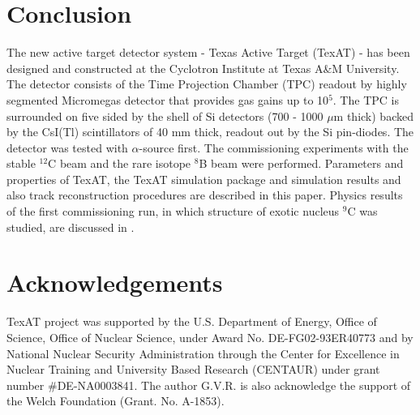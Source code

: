 \documentclass[final,number,sort&compress,5p,times,twocolumn]{elsarticle}
\begin{document}
\section{Conclusion}

The new active target detector system - Texas Active Target (TexAT) - has been designed and constructed at the Cyclotron Institute at Texas A\&M University. The detector consists of the Time Projection Chamber (TPC) readout by highly segmented Micromegas detector that provides gas gains up to 10$^5$. The TPC is surrounded on five sided by the shell of Si detectors (700 - 1000 $\mu$m thick) backed by the CsI(Tl) scintillators of 40 mm thick, readout out by the Si pin-diodes. The detector was tested with $\alpha$-source first. The commissioning experiments with the stable $^{12}$C beam and the rare isotope $^8$B beam were performed. Parameters and properties of TexAT, the TexAT simulation package and simulation results and also track reconstruction procedures are described in this paper. Physics results of the first commissioning run, in which structure of exotic nucleus $^9$C was studied, are discussed in \cite{JHooker}.
 
\section*{Acknowledgements}

TexAT project  was supported by the U.S. Department of Energy, Office of Science, Office of
Nuclear Science, under Award No. DE-FG02-93ER40773 and by National Nuclear Security Administration through the Center for Excellence in Nuclear Training and University Based Research (CENTAUR) under grant number \#DE-NA0003841.
The author G.V.R. is also acknowledge the support of the Welch Foundation (Grant. No. A-1853).



% 

\end{document}
